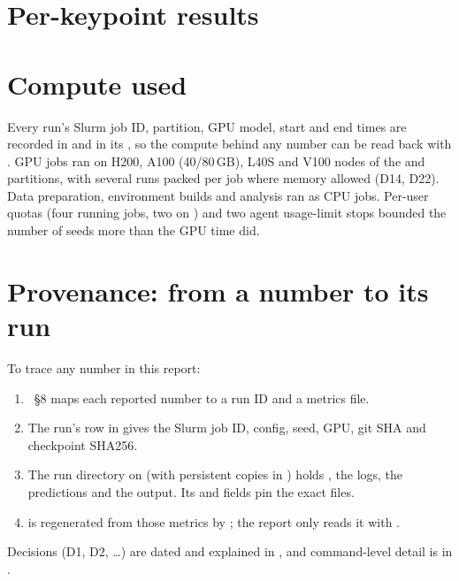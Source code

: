 \section{Per-keypoint results}\label{app:perkp}

\begin{table}[h]
  \centering\small
  \caption{Per-keypoint accuracy on Test100: median error as a percentage of $\sqrt{wh}$ of the GT box, and PCK with the same normaliser, over labelled joints only.}
  \label{tab:perkp}
\end{table}

\section{Compute used}\label{app:compute}

Every run's Slurm job ID, partition, GPU model, start and end times are recorded in  and in its , so the compute behind any number can be read back with .
GPU jobs ran on H200, A100 (40/80\,GB), L40S and V100 nodes of the  and  partitions, with several runs packed per job where memory allowed (D14, D22). Data preparation, environment builds and analysis ran as CPU jobs.
Per-user quotas (four running  jobs, two on ) and two agent usage-limit stops bounded the number of seeds more than the GPU time did.

\section{Provenance: from a number to its run}\label{app:provenance}

To trace any number in this report:
\begin{enumerate}[leftmargin=*]
  \item {}~\S8 maps each reported number to a run ID and a metrics file.
  \item The run's row in  gives the Slurm job ID, config, seed, GPU, git SHA and checkpoint SHA256.
  \item The run directory  on  (with persistent copies in ) holds , the logs, the predictions and the  output. Its  and  fields pin the exact files.
  \item {} is regenerated from those metrics by ; the report only reads it with \code{}.
\end{enumerate}
Decisions (D1, D2, \dots) are dated and explained in , and command-level detail is in .

